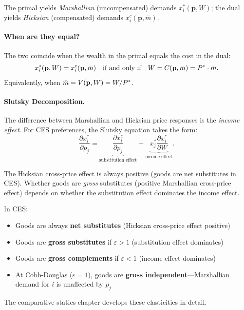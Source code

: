 The primal yields \emph{Marshallian} (uncompensated) demands $x_i^*(\mathbf{p}, W)$; the dual yields \emph{Hicksian} (compensated) demands $x_i^c(\mathbf{p}, \bar{m})$.

\paragraph{When are they equal?}
The two coincide when the wealth in the primal equals the cost in the dual:
\begin{equation}
x_i^*(\mathbf{p}, W) = x_i^c(\mathbf{p}, \bar{m}) \quad \text{if and only if} \quad W = C(\mathbf{p}, \bar{m}) = P^{*} \cdot \bar{m}.
\end{equation}
Equivalently, when $\bar{m} = V(\mathbf{p}, W) = W/P^{*}$.

\paragraph{Slutsky Decomposition.}
The difference between Marshallian and Hicksian price responses is the \emph{income effect}. For CES preferences, the Slutsky equation takes the form:
\begin{equation}
\frac{\partial x_i^*}{\partial p_j} = \underbrace{\frac{\partial x_i^c}{\partial p_j}}_{\text{substitution effect}} - \underbrace{x_j^* \frac{\partial x_i^*}{\partial W}}_{\text{income effect}}.
\end{equation}

The Hicksian cross-price effect is always positive (goods are net substitutes in CES). Whether goods are \emph{gross} substitutes (positive Marshallian cross-price effect) depends on whether the substitution effect dominates the income effect.

\begin{calloutnote}
In CES:
\begin{itemize}[nosep]
\item Goods are always \textbf{net substitutes} (Hicksian cross-price effect positive)
\item Goods are \textbf{gross substitutes} if $\varepsilon > 1$ (substitution effect dominates)
\item Goods are \textbf{gross complements} if $\varepsilon < 1$ (income effect dominates)
\item At Cobb-Douglas ($\varepsilon = 1$), goods are \textbf{gross independent}---Marshallian demand for $i$ is unaffected by $p_j$
\end{itemize}
The comparative statics chapter develops these elasticities in detail.
\end{calloutnote}

